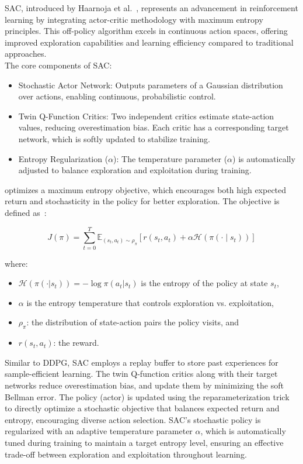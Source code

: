 \gls{SAC}, introduced by Haarnoja et al.~\cite{haarnoja2018softactorcriticoffpolicymaximum}, represents an advancement in reinforcement learning by integrating actor-critic methodology with maximum entropy principles. This off-policy algorithm excels in continuous action spaces, offering improved exploration capabilities and learning efficiency compared to traditional approaches.\\

\noindent The core components of {\gls{SAC}}:
\begin{itemize}[noitemsep]
  \item Stochastic Actor Network: Outputs parameters of a Gaussian distribution over actions, enabling continuous, probabilistic control.
  \item Twin Q-Function Critics:  Two independent critics estimate state-action values, reducing overestimation bias. Each critic has a corresponding target network, which is softly updated to stabilize training.
  \item Entropy Regularization ($\alpha$): The temperature parameter ($\alpha$) is automatically adjusted to balance exploration and exploitation during training.
\end{itemize}

 optimizes a maximum entropy objective, which encourages both high expected return and stochasticity in the policy for better exploration. The objective is defined as~\cite{haarnoja2018softactorcriticoffpolicymaximum}:

{\footnotesize
\begin{equation}
J(\pi) = \sum_{t=0}^{T} \mathbb{E}_{(s_t, a_t) \sim \rho_\pi} \left[ r(s_t, a_t) + \alpha \mathcal{H}(\pi(\cdot \mid s_t)) \right]
\end{equation}
}

\noindent where:

\begin{itemize}
    \item \(\mathcal{H}(\pi(\cdot|s_t)) = -\log \pi(a_t|s_t)\) is the entropy of the policy at state \(s_t\),
    \item \(\alpha\) is the entropy temperature that controls exploration vs. exploitation,
    \item \(\rho_\pi\): the distribution of state-action pairs the policy visits, and
    \item \(r(s_t, a_t)\): the reward.
\end{itemize}

\noindent Similar to {\gls{DDPG}}, {\gls{SAC}} employs a replay buffer to store past experiences for sample-efficient learning. The twin Q-function critics along with their target networks reduce overestimation bias, and update them by minimizing the soft Bellman error. The policy (actor) is updated using the reparameterization trick to directly optimize a stochastic objective that balances expected return and entropy, encouraging diverse action selection. {\gls{SAC}}’s stochastic policy is regularized with an adaptive temperature parameter \(\alpha\), which is automatically tuned during training to maintain a target entropy level, ensuring an effective trade-off between exploration and exploitation throughout learning.\\

